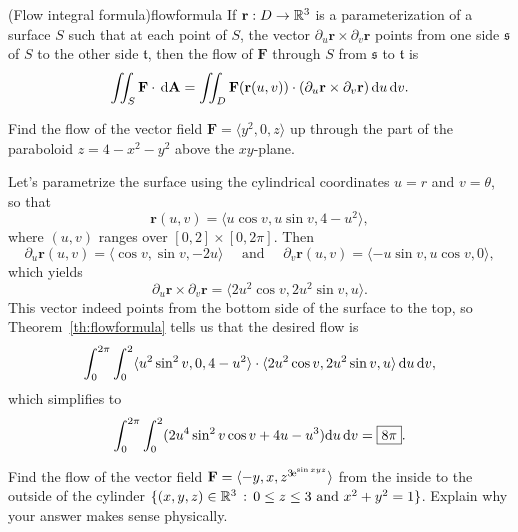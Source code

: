\documentclass{watsonbook}
\begin{document}
\begin{theo}{(Flow integral formula)}{flowformula}
  If $\mathbf{r}:D \to \mathbb{R}^3$ is a parameterization of a surface $S$
  such that at each point of $S$, the vector
  $\partial_u \mathbf{r} \times \partial_v \mathbf{r}$ points from one
  side $\mathfrak{s}$ of $S$ to the other side $\mathfrak{t}$, then
  the flow of $\mathbf{F}$ through $S$ from $\mathfrak{s}$ to
  $\mathfrak{t}$ is 
  \begin{equation} \label{eq:surfformula} 
    \iint_S \mathbf{F}\cdot \, {\mathrm{d}}\mathbf{A} = \iint_D
    \mathbf{F}(\mathbf{r}(u,v)) \cdot (\partial_u
    \mathbf{r} \times \partial_v \mathbf{r}) \, {\mathrm{d}}u\,{\mathrm{d}}v. 
  \end{equation}
\end{theo}

\begin{example}{}{}
  Find the flow of the vector field $\mathbf{F} = \langle y^2, 0, z
  \rangle$ up through the part of the paraboloid $z = 4 - x^2 - y^2$
  above the $xy$-plane. 
\end{example}

\begin{solution}
  Let's parametrize the surface using the cylindrical coordinates $u=r$
  and $v=\theta$, so that
  \[
    \mathbf{r}(u,v) = \langle u\cos v, u \sin v, 4 - u^2 \rangle, 
  \]
  where $(u,v)$ ranges over $[0,2] \times [0,2\pi]$. Then 
  \[
    \partial_u \mathbf{r}(u,v) = \langle \cos v, \sin v, -2u \rangle \quad \text{ and } \quad
    \partial_v \mathbf{r}(u,v) = \langle -u\sin v, u \cos v, 0
    \rangle, 
  \]
  which yields 
  \[
    \partial_u\mathbf{r} \times \partial_v \mathbf{r} = \langle 2 u^{2} \cos v,2 u^{2} \sin v, u \rangle. 
  \]
  This vector indeed points from the bottom side of the surface to the
  top, so Theorem~\ref{th:flowformula} tells us that the desired flow
  is 
  \[
    \int_{0}^{2\pi}\int_{0}^{2} \langle u^2 \sin^2 v, 0, 4-u^2
    \rangle \cdot \langle 2 u^{2} \cos v,2 u^{2} \sin v, u \rangle \,
    \mathrm{d} u \, \mathrm{d}{v}, 
  \]
  which simplifies to
  \[
    \int_{0}^{2\pi}\int_{0}^{2} (2 u^4 \sin^2 v \cos v + 4u - u^3)
    \mathrm{d} u \, \mathrm{d}{v} = \boxed{8\pi}. 
  \]
\end{solution}

\begin{exercise}{}{}
  Find the flow of the vector field $\mathbf{F} = \langle -y, x,
  z^{3\hspace{-1pt}\mathrm{e}^{\sin xyz}}\rangle$
  from the inside to the outside of the cylinder $\{(x,y,z) \in \mathbb{R}^3
  \,: \, 0 \leq z \leq 3 \text{ and } x^2 + y^2 = 1\}$. Explain why
  your answer makes sense physically. 
\end{exercise}
\end{document}
